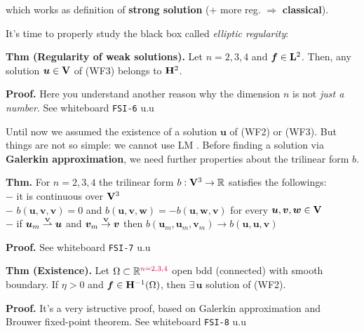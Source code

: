 which works as definition of \textbf{strong solution} (+ more reg. $\Rightarrow$ \textbf{classical}).

\medskip

It's time to properly study the black box called \emph{elliptic regularity}:

\textbf{Thm (Regularity of weak solutions).} Let $n=2,3,4$ and $\bm f\in\mathbf{L}^2$. Then, any solution $\bm u\in\mathbf{V}$ of (WF3) belongs to $\mathbf{H}^2$.

\textbf{\color{lavender(floral)}Proof.} {\color{purple} Here you understand another reason why the dimension $n$ is not \emph{just a number}. } See whiteboard \texttt{FSI-6} u.u

\noindent\rlap{\rule[1.5ex]{0.495\textwidth}{.2pt}}\vspace{-0.3em}


Until now we assumed the existence of a solution $\bm u$ of (WF2) or (WF3). But things are not so simple: we cannot use LM \Sadey. Before finding a solution via \textbf{Galerkin approximation}, we need further properties about the trilinear form $b$.

\smallskip

\textbf{Thm.} {\color{purple} For $n=2,3,4$} the trilinear form $b:\mathbf{V}^3\to\mathbb{R}$ satisfies the followings: \\
$-$ it is continuous over $\mathbf{V}^3$ \\
$-$ $b(\bm u,\bm v,\bm v)=0$ and $b(\bm u,\bm v,\bm w)=-b(\bm u,\bm w,\bm v)$ for every $\bm u,\bm v,\bm w \in \mathbf{V}$ \\
$-$ if $\bm u_m \overset{\scriptscriptstyle\mathbf{V}}{\rightharpoonup}\bm u$ and $\bm v_m \overset{\scriptscriptstyle\mathbf{V}}{\rightarrow}\bm v$ then $b(\bm u_m, \bm u_m, \bm v_m)\rightarrow b(\bm u,\bm u,\bm v)$ 

\textbf{\color{lavender(floral)}Proof.} See whiteboard \texttt{FSI-7} u.u

\smallskip

\textbf{Thm (Existence).} Let $\Omega\subset\mathbb{R}^{\color{purple}n=2,3,4}$ open bdd (connected) with smooth boundary. If $\eta>0$ and $\bm f \in \mathbf{H}^{-1}(\Omega)$, then $\exists\,\bm u$ solution of (WF2).

\textbf{\color{lavender(floral)}Proof.} It's a very istructive proof, based on Galerkin approximation and Brouwer fixed-point theorem. See whiteboard \texttt{FSI-8} u.u

\noindent\rlap{\rule[1.5ex]{0.495\textwidth}{.2pt}}\vspace{-0.3em}

